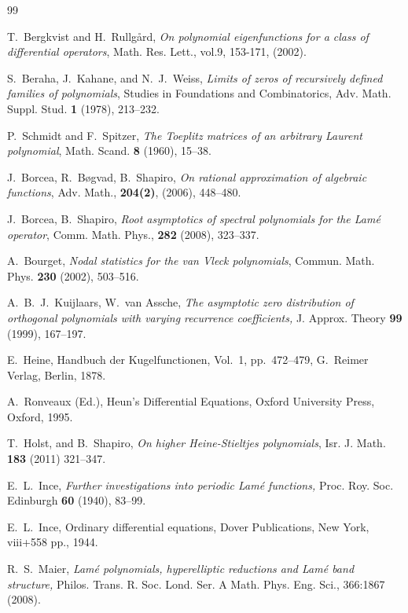 \documentclass[10pt,twoside,a4paper,reqno]{amsart}
\theoremstyle{plain}
\theoremstyle{definition}
\theoremstyle{remark}
\begin{document}
\begin{thebibliography}{99}


 T.~Bergkvist and H.~Rullg\aa rd, {\em On polynomial
eigenfunctions for a class of differential operators}, Math. Res. Lett.,
vol.9, 153-171, (2002).



S.~Beraha, J.~Kahane, and N.~J.~Weiss,
{\em Limits of zeros of recursively defined families of polynomials},
Studies in Foundations and Combinatorics, Adv. Math. Suppl. Stud. {\bf 1}
(1978), 213--232.

P.~Schmidt and F.~Spitzer,
{\em The Toeplitz matrices of an arbitrary Laurent polynomial},
Math. Scand. {\bf 8} (1960), 15--38.

J.~Borcea, R.~B\o gvad, B.~Shapiro,  {\em On rational approximation of algebraic functions}, 
Adv. Math., {\bf 204(2)},  (2006), 448--480. 

 J.~Borcea,  B.~Shapiro, {\em Root asymptotics of spectral polynomials for the Lam\'e operator}, 
Comm. Math. Phys., {\bf 282} (2008),  323--337.  

A.~Bourget, {\em Nodal statistics for the van Vleck polynomials}, 
Commun. Math. Phys. {\bf 230} (2002), 503--516.

A.~B.~J.~Kuijlaars, W.~van Assche, {\em The asymptotic zero distribution of 
orthogonal polynomials with varying recurrence coefficients,} 
J. Approx. Theory {\bf 99} (1999), 167--197. 


E.~Heine, Handbuch der Kugelfunctionen, Vol.~1, pp.~472--479, 
G.~Reimer Verlag, Berlin, 1878.


 A.~Ronveaux (Ed.), Heun's Differential Equations, Oxford University Press, Oxford, 1995.

 T.~Holst, and B.~Shapiro, {\em  On higher Heine-Stieltjes polynomials},  Isr. J. Math. {\bf 183} (2011) 321--347. 

E.~L.~Ince, {\em Further investigations into periodic Lam\'e functions,}
Proc. Roy. Soc. Edinburgh {\bf 60} (1940), 83--99.  

E.~L.~Ince, Ordinary differential equations, Dover Publications, New York, 
 viii+558 pp., 1944. 

R.~S.~Maier, {\em Lam\'e  polynomials, hyperelliptic reductions and 
Lam\'e band structure,} Philos. Trans. R. Soc. Lond. Ser. A Math. Phys. Eng. Sci., 366:1867 (2008). 


\end{thebibliography}
\end{document}
